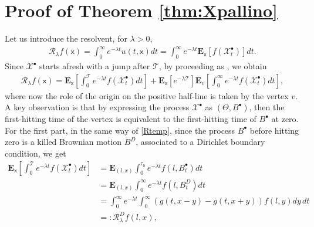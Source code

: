 \documentclass[11pt,a4paper]{article}
\theoremstyle{plain}
\theoremstyle{definition}
\theoremstyle{remark}
\begin{document}
		\section{Proof of Theorem \ref{thm:Xpallino}}
		\label{proof2}
		Let us introduce the resolvent, for $\lambda >0$,
		\begin{align*}
			\mathcal{R}_\lambda f(\mathsf{x})=\int_{0}^{\infty} e^{-\lambda t} u(t,\mathsf{x}) dt =\int_{0}^{\infty} e^{-\lambda t} \mathbf{E}_\mathsf{x}[f(\mathcal{X}^\bullet_t)] dt.
		\end{align*}
		Since $\mathcal{X}^\bullet$ starts afresh with a jump after $\mathcal{T}$, by proceeding as \cite[Formula 2, Section 15]{ito1963brownian}, we obtain
		\begin{align}
			\label{resolvent}
			\mathcal{R}_\lambda f(\mathsf{x})=\mathbf{E}_\mathsf{x} \left[\int_{0}^{\mathcal{T}} e^{-\lambda t} f(\mathcal{X}^\bullet_t) dt \right] + \mathbf{E}_\mathsf{x}\left[e^{-\lambda \mathcal{T}}\right] \mathbf{E}_v\left[\int_{0}^{\infty} e^{-\lambda t} f(\mathcal{X}^\bullet_t) dt  \right],
		\end{align}
		where now the role of the origin on the positive half-line is taken by the vertex $v$. A key observation is that by expressing the process $\mathcal{X}^\bullet$ as $(\Theta, B^\bullet)$, then the first-hitting time of the vertex is equivalent to the first-hitting time of $B^\bullet$ at zero. For the first part, in the same way of \eqref{Rtemp}, since the process $B^\bullet$ before hitting zero is a killed Brownian motion $B^D$, associated to a Dirichlet boundary condition, we get
		\begin{align*}
			\mathbf{E}_\mathsf{x} \left[\int_{0}^{\mathcal{T}} e^{-\lambda t} f(\mathcal{X}^\bullet_t) dt \right]&=\mathbf{E}_{(l,x)}\int_0^{\tau_0} e^{-\lambda t} f(l, B^\bullet_t)dt\\&=\mathbf{E}_{(l,x)}\int_0^\infty e^{-\lambda t} f(l, B^D_t)dt\\
			&=\int_0^\infty e^{-\lambda t} \int_0^\infty (g(t,x-y)-g(t,x+y))f(l,y) dy \,dt\\
			&=:\mathcal{R}_\lambda^D f(l,x),
		\end{align*}
\end{document}
